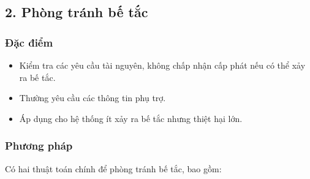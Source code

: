 \documentclass[12pt]{report}
\begin{document}
\subsection*{2. Phòng tránh bế tắc}
\subsubsection*{Đặc điểm}
\begin{itemize}
	\item Kiểm tra các yêu cầu tài nguyên, không chấp nhận cấp phát nếu có thể xảy ra bế tắc.
	\item Thường yêu cầu các thông tin phụ trợ.
	\item Áp dụng cho hệ thống ít xảy ra bế tắc nhưng thiệt hại lớn.
\end{itemize}
\subsubsection*{Phương pháp}
Có hai thuật toán chính để phòng tránh bế tắc, bao gồm:
\end{document}
